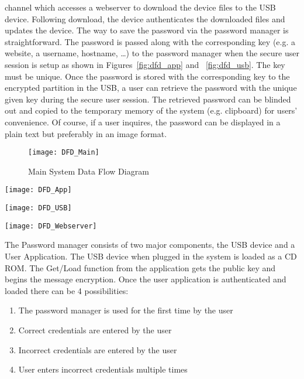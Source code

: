 channel which accesses a webserver to download the device files to the USB
device.  Following download, the device authenticates the downloaded files and
updates the device.
The way to save the password via the password manager is straightforward. The
password is passed along with the corresponding key (e.g. a website, a username,
hostname, \dots) to the password manager when the secure user session is
setup as shown in Figures~\ref{fig:dfd_app} and ~\ref{fig:dfd_usb}. The key
must be unique. Once
the password is stored with the corresponding key to the encrypted partition in
the USB, a user can retrieve the password with the unique given key during the
secure user session. The retrieved password can be blinded out and copied to the
temporary memory of the system (e.g. clipboard) for users' convenience. Of
course, if a user inquires, the password can be displayed in a plain text but
preferably in an image format.

\begin{figure}
    \centering
    \texttt{[image: DFD\_Main]}
    \caption{Main System Data Flow Diagram}
    \label{fig:dfd_main}
\end{figure}
\begin{figure*}
    \centering
    \texttt{[image: DFD\_App]}
    \caption{System Data Flow Diagram in the App side}
    \label{fig:dfd_app}
\end{figure*}

\begin{figure*}
    \centering
    \texttt{[image: DFD\_USB]}
    \caption{System Data Flow Diagram in the USB side}
    \label{fig:dfd_usb}
\end{figure*}



\begin{figure*}
    \centering
    \texttt{[image: DFD\_Webserver]}
    \caption{System Data Flow Diagram for the Webserverer}
    \label{fig:wsdfd}
\end{figure*}

The Password manager consists of two major components, the USB device and a User
Application. The USB device when plugged in the system is loaded as a CD
ROM. The Get/Load function from the application gets the public key and begins
the message
encryption. Once the user application is authenticated and loaded there can be 4
possibilities:
\begin{enumerate}
\item The password manager is used for the first time by the user
\item Correct credentials are entered by the user
\item Incorrect credentials are entered by the user
\item User enters incorrect credentials multiple times
\end{enumerate}

